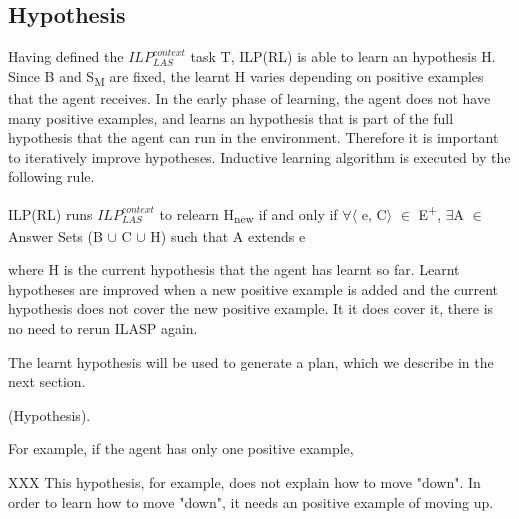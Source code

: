 \subsection{Hypothesis}
\label{sebsec:hypothesis}
Having defined the $ILP_{LAS}^{context}$ task T, ILP(RL) is able to learn an hypothesis H. 
Since B and S\textsubscript{M} are fixed, the learnt H varies depending on positive examples that the agent receives.
In the early phase of learning, the agent does not have many positive examples, and learns an hypothesis that is part of the full hypothesis that the agent can run in the environment.
Therefore it is important to iteratively improve hypotheses. Inductive learning algorithm is executed by the following rule.
\begin{defn}
ILP(RL) runs $ILP_{LAS}^{context}$ to relearn H\textsubscript{new} if and only if $\forall$$\langle$ e, C$\rangle$ $\in$ E\textsuperscript{+}, $\exists$A $\in$ Answer Sets (B $\cup$ C $\cup$ H) such that A extends e
\label{def:context}
\end{defn}
where H is the current hypothesis that the agent has learnt so far. 
Learnt hypotheses are improved when a new positive example is added and the current hypothesis does not cover the new positive example.
It it does cover it, there is no need to rerun ILASP again.

The learnt hypothesis will be used to generate a plan, which we describe in the next section.

\begin{examp} \normalfont (Hypothesis).

For example, if the agent has only one positive example,

XXX
This hypothesis, for example, does not explain how to move "down". In order to learn how to move "down", it needs an positive example of moving up.
\end{examp}
    

